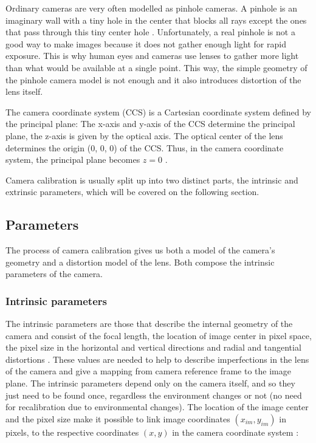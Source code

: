 \documentclass[msc, a4paper, classic, en]{ufbathesis}
\begin{document}
Ordinary cameras are very often modelled as pinhole cameras. A pinhole is an imaginary wall with a tiny hole in the center that blocks all rays except the ones that pass through this tiny center hole \cite{bradski2008learning}. Unfortunately, a real pinhole is not a good way to make images because it does not gather enough light for rapid exposure. This is why human eyes and cameras use lenses to gather more light than what would be available at a single point. This way, the simple geometry of the pinhole camera model is not enough and it also introduces distortion of the lens itself.

The camera coordinate system (CCS) is a Cartesian coordinate system defined by the principal plane: The x-axis and y-axis of the CCS determine the principal plane, the z-axis is given by the optical axis. The optical center of the lens determines the origin (0, 0, 0) of the CCS. Thus, in the camera coordinate system, the principal plane becomes ${ z = 0 }$ \cite{hanning2011high}.

Camera calibration is usually split up into two distinct parts, the intrinsic and extrinsic parameters, which will be covered on the following section.

\subsection{Parameters}

The process of camera calibration gives us both a model of the camera's geometry and a distortion model of the lens. Both compose the intrinsic parameters of the camera.

\subsubsection{Intrinsic parameters}

The intrinsic parameters are those that describe the internal geometry of the camera and consist of the focal length, the location of image center in pixel space, the pixel size in the horizontal and vertical directions and radial and tangential distortions \cite{malik2002}. These values are needed to help to describe imperfections in the lens of the camera and give a mapping from camera reference frame to the image plane. The intrinsic parameters depend only on the camera itself, and so they just need to be found once, regardless the environment changes or not (no need for recalibration due to environmental changes). The location of the image center and the pixel size make it possible to link image coordinates $(x_{im}, y_{im})$ in pixels, to the respective coordinates $(x, y)$ in the camera coordinate system \cite{malik2002}:
\end{document}
